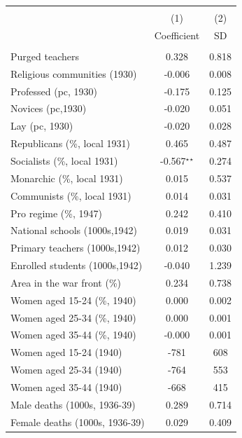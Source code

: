 \begin{tabular}{l c c }\hline\hline  \\[-0.3cm] & (1) & (2)  \\ [0.1cm] & {Coefficient} & {SD}  \\ [0.1cm] \hline \\ 
Purged teachers&	0.328&	0.818	\\
Religious communities (1930)&	-0.006&	0.008	\\
Professed (pc, 1930)&	-0.175&	0.125	\\
Novices (pc,1930)&	-0.020&	0.051	\\
Lay (pc, 1930)&	-0.020&	0.028	\\
Republicans (\%, local 1931)&	0.465&	0.487	\\
Socialists (\%, local 1931)&	-0.567$^\star$$^\star$&	0.274	\\
Monarchic (\%, local 1931)&	0.015&	0.537	\\
Communists (\%, local 1931)&	0.014&	0.031	\\
Pro regime (\%, 1947)&	0.242&	0.410	\\
National schools (1000s,1942)&	0.019&	0.031	\\
Primary teachers (1000s,1942)&	0.012&	0.030	\\
Enrolled students (1000s,1942)&	-0.040&	1.239	\\
Area in the war front (\%)&	0.234&	0.738	\\
Women aged 15-24 (\%, 1940) &	0.000&	0.002	\\
Women aged 25-34 (\%, 1940) &	0.000&	0.001	\\
Women aged 35-44 (\%, 1940) &	-0.000&	0.001	\\
Women aged 15-24 (1940) &	-781&	608	\\
Women aged 25-34 (1940) &	-764&	553	\\
Women aged 35-44 (1940) &	-668&	415	\\
Male deaths (1000s, 1936-39)&	0.289&	0.714	\\
Female deaths (1000s, 1936-39)&	0.029&	0.409	\\
\hline\hline \end{tabular}